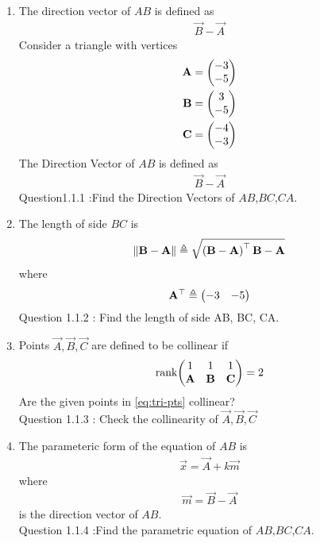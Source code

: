 
\begin{enumerate}[label=\thesection.\arabic*.,ref=\thesection.\theenumi]

\item The direction vector of $AB$ is defined as
		\begin{align}
			\vec{B}-
			\vec{A}
		\end{align}
Consider a triangle with vertices
\begin{align} 
 \mathbf{A} &= \begin{pmatrix} -3\\ -5 \end{pmatrix} \\ \mathbf{B} &= \begin{pmatrix} 3\\ -5 \end{pmatrix}
  \\\mathbf{C} &= \begin{pmatrix} -4\\ -3\end{pmatrix}
 \end{align}
The Direction Vector of $AB$ is defined as 
\begin{align} 
\vec{B} - \vec{A}
\end{align}
Question1.1.1 :Find the Direction Vectors of $AB$,$BC$,$CA$.\\


\item The length of side $BC$ is 
		\begin{align}
			\left\lVert\mathbf{B}-\mathbf{A}\right\rVert \triangleq \sqrt{\left(\mathbf{B}-\mathbf{A}\right)^{\top}{\mathbf{B}-\mathbf{A}}}
		\end{align}
		where
		\begin{align}
			\mathbf{A}^{\top}\triangleq\begin{pmatrix}-3 & -5\end{pmatrix}
		\end{align}
Question 1.1.2 : Find the length of side AB, BC, CA.\\


\item   Points $\vec{A}, \vec{B}, \vec{C}$ are defined to be collinear if 
		\begin{align}
			\text{rank}{\ensuremath{\begin{pmatrix}1 & 1 & 1 \\ \mathbf{A}& \mathbf{B}&\mathbf{C}\end{pmatrix}}} = 2
		\end{align}
Are the given points in
			\eqref{eq:tri-pts}
collinear?\\
Question 1.1.3 : Check the collinearity of $\vec{A},\vec{B},\vec{C}$ \\ 


\item The parameteric form of the equation  of $AB$ is 
		\begin{align}
			\vec{x}=\vec{A}+k\vec{m}
		\end{align}
		where
		\begin{align}
\vec{m}=\vec{B}-\vec{A}
		\end{align}
is the direction vector of $AB$.\\
Question 1.1.4 :Find the parametric equation of $AB$,$BC$,$CA$.\\



\end{enumerate}
